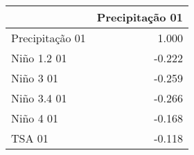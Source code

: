 \begin{tabular}{lr}
\toprule
{} &  Precipitação 01 \\
\midrule
Precipitação 01 &            1.000 \\
Niño 1.2 01     &           -0.222 \\
Niño 3 01       &           -0.259 \\
Niño 3.4 01     &           -0.266 \\
Niño 4 01       &           -0.168 \\
TSA 01          &           -0.118 \\
\bottomrule
\end{tabular}
